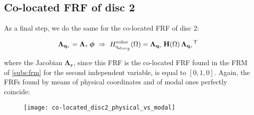 \documentclass[a4paper,12pt,oneside]{article}
\begin{document}
\clearpage

\subsection{Co-located FRF of disc 2}

As a final step, we do the same for the co-located FRF of disc 2:

\[
	\mathbf{\Lambda_{q_\tau}} = \mathbf{\Lambda_\tau} \, \bm{\phi} ~ \Rightarrow ~
		H^\textup{coloc}_{\textup{q}_{disc_2}}(\Omega) =
		\mathbf{\Lambda_{q_\tau}} \, \mathbf{H}(\Omega) \,
		\mathbf{\Lambda_{q_\tau}}^\textup{T}
\]

where the Jacobian $ \mathbf{\Lambda_\tau} $, since this FRF is the co-located FRF found in the FRM of \ref{subs:frm} for the second independent variable, is equal to $ [0, 1, 0] $. Again, the FRFs found by means of physical coordinates and of modal ones perfectly coincide:

\begin{figure}[h]
	\hspace{-70pt}
	\texttt{[image: co-located\_disc2\_physical\_vs\_modal]}
\end{figure}
\end{document}
